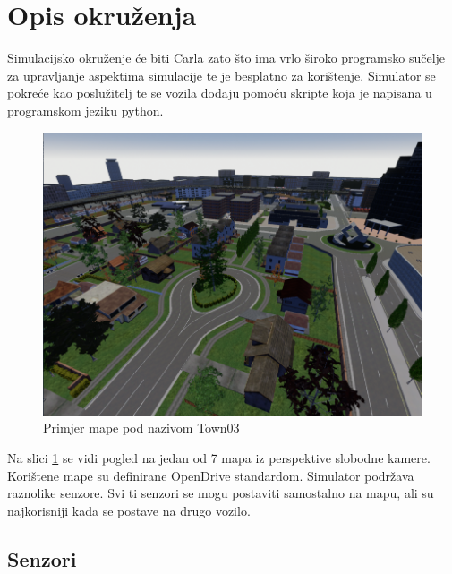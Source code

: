 \section{Opis okruženja}

Simulacijsko okruženje će biti Carla zato što ima vrlo široko programsko sučelje za upravljanje aspektima simulacije te je besplatno za korištenje. Simulator se pokreće kao poslužitelj te se vozila dodaju pomoću skripte koja je napisana u programskom jeziku python.

\begin{figure}[ht!]
  \centering
  \includegraphics[scale=0.5]{images/carla_town03_example.png}
  \caption{Primjer mape pod nazivom Town03}
  \label{fig:town03_exmaple}
\end{figure}

Na slici \ref{fig:town03_exmaple} se vidi pogled na jedan od 7 mapa iz perspektive slobodne kamere. Korištene mape su definirane OpenDrive standardom. Simulator podržava raznolike senzore. Svi ti senzori se mogu postaviti samostalno na mapu, ali su najkorisniji kada se postave na drugo vozilo.

\newpage
\subsection{Senzori}
